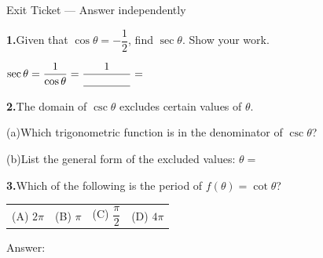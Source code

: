 \documentclass[10pt]{article}
\begin{document}
\namedateperiod

\vspace{0.12in}

\begin{notesbox}{Exit Ticket --- Answer independently}

\textbf{1.}\quad Given that $\cos\theta = -\dfrac{1}{2}$, find $\sec\theta$.
Show your work.

\vspace{4pt}
$\sec\theta = \dfrac{1}{\cos\theta} = \dfrac{1}{\underline{\hspace{1.5cm}}} = $ \underline{\hspace{2.5cm}}

\vspace{0.18in}
\textbf{2.}\quad The domain of $\csc\theta$ excludes certain values of $\theta$.

\vspace{4pt}
(a)\quad Which trigonometric function is in the denominator of $\csc\theta$?
\underline{\hspace{3cm}}

\vspace{6pt}
(b)\quad List the general form of the excluded values:
$\theta = $ \underline{\hspace{4cm}}

\vspace{0.18in}
\textbf{3.}\quad Which of the following is the period of $f(\theta) = \cot\theta$?

\vspace{6pt}
\begin{tabular}{llll}
(A)\; $2\pi$ \qquad & (B)\; $\pi$ \qquad & (C)\; $\dfrac{\pi}{2}$ \qquad & (D)\; $4\pi$
\end{tabular}

\vspace{6pt}
Answer: \underline{\hspace{1.5cm}}

\end{notesbox}
\end{document}
